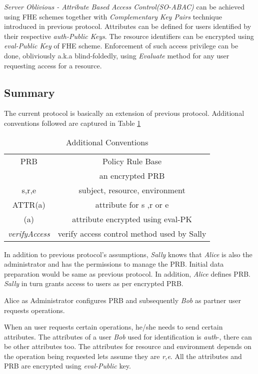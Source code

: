 \documentclass[conference]{IEEEtran}
\numberwithin{equation}{section}
\begin{document}
\emph{Server Oblivious - Attribute Based Access Control(SO-ABAC)} can be achieved using FHE schemes together with \emph{Complementary Key Pairs} technique introduced in previous protocol. Attributes can be defined for users identified by their respective \emph{auth-Public Keys}. The resource identifiers can be encrypted using \emph{eval-Public Key} of FHE scheme. Enforcement of such access privilege can be done, obliviously a.k.a blind-foldedly, using \emph{Evaluate} method for any user requesting access for a resource.
\subsection{Summary}
The current protocol is basically an extension of previous protocol. Additional conventions followed are captured in Table \ref{conventionAddl}
\begin{table}
\caption {Additional Conventions} 
\label{conventionAddl}
\renewcommand{\arraystretch}{2.5}
\begin{center}
\begin{tabular} {|c  c|}
\hline
{PRB} & {Policy Rule Base} \\
{} & {an encrypted PRB} \\
{s,r,e} & {subject, resource, environment} \\
{ATTR(a)} & {attribute for s ,r or e} \\
{(a)} & {attribute encrypted using eval-PK} \\
{\emph{verifyAccess}}&{verify access control method used by Sally} \\
 \hline
\end{tabular}
\end{center}
\end{table}

In addition to previous protocol's assumptions, \emph{Sally} knows that \emph{Alice} is also the administrator and has the permissions to  manage the PRB. Initial data preparation would be same as previous protocol. In addition, \emph{Alice} defines PRB. \emph{Sally} in turn grants access to users as per encrypted PRB.

 Alice as Administrator configures PRB and subsequently \emph{Bob} as partner user requests operations. 
  
  When an user requests certain operations, he/she needs to send certain attributes. The attributes of a user \emph{Bob} used for identification is {\emph{auth}-}, there can be other attributes too. The attributes for resource and environment depends on the operation being requested lets assume they are \emph{r,e}. All the attributes and PRB are encrypted using \emph{eval-Public} key.
\end{document}
